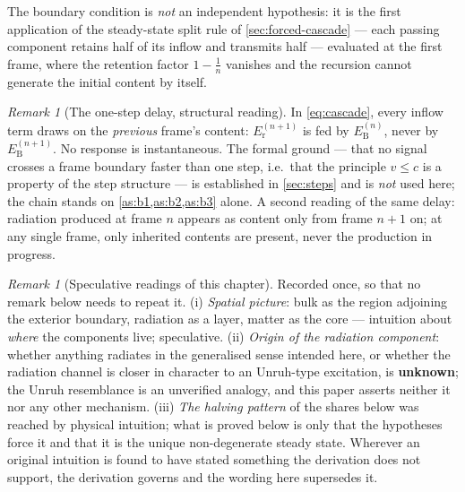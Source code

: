 \documentclass[11pt]{amsbook}
\theoremstyle{plain}
\theoremstyle{definition}
\theoremstyle{remark}
\newtheorem{remark}[theorem]{Remark}
\begin{document}
The boundary condition is \emph{not} an independent hypothesis: it is the first application of the steady-state split rule of \cref{sec:forced-cascade} --- each passing component retains half of its inflow and transmits half --- evaluated at the first frame, where the retention factor $1 - \tfrac1n$ vanishes and the recursion cannot generate the initial content by itself.

\begin{remark}[The one-step delay, structural reading]\label{rem:delay}
In \cref{eq:cascade}, every inflow term draws on the \emph{previous} frame's content: $E_{\mathrm r}^{(n+1)}$ is fed by $E_{\mathrm B}^{(n)}$, never by $E_{\mathrm B}^{(n+1)}$. No response is instantaneous. The formal ground --- that no signal crosses a frame boundary faster than one step, i.e.\ that the principle $v \leq c$ is a property of the step structure --- is established in \cref{sec:steps} and is \emph{not} used here; the chain stands on \cref{as:b1,as:b2,as:b3} alone. A second reading of the same delay: radiation produced at frame $n$ appears as content only from frame $n+1$ on; at any single frame, only inherited contents are present, never the production in progress.
\end{remark}

\begin{remark}[Speculative readings of this chapter]\label{rem:speculation}
Recorded once, so that no remark below needs to repeat it. (i) \emph{Spatial picture}: bulk as the region adjoining the exterior boundary, radiation as a layer, matter as the core --- intuition about \emph{where} the components live; speculative. (ii) \emph{Origin of the radiation component}: whether anything radiates in the generalised sense intended here, or whether the radiation channel is closer in character to an Unruh-type excitation, is \textbf{unknown}; the Unruh resemblance is an unverified analogy, and this paper asserts neither it nor any other mechanism. (iii) \emph{The halving pattern} of the shares below was reached by physical intuition; what is proved below is only that the hypotheses force it and that it is the unique non-degenerate steady state. Wherever an original intuition is found to have stated something the derivation does not support, the derivation governs and the wording here supersedes it.
\end{remark}
\end{document}
